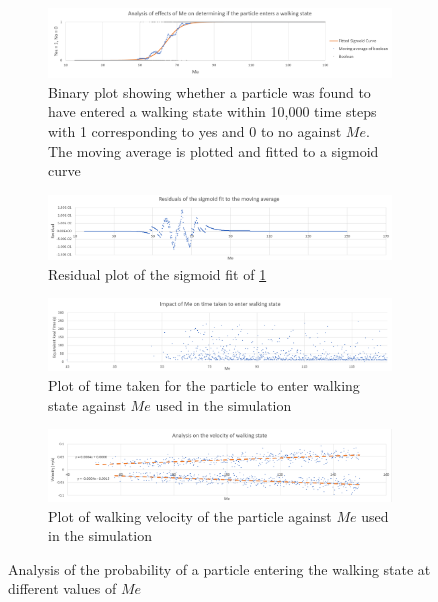 \begin{figure}
	\centering
	\begin{subfigure}{\textwidth}
		\includegraphics[width=\textwidth]{simulation/varmemory/walkingstate.png}
		\caption{Binary plot showing whether a particle was found to have entered a walking state within 10,000 time steps with 1 corresponding to yes and 0 to no against $Me$. The moving average is plotted and fitted to a sigmoid curve}
		\label{fig:varmem:walkingstate}
	\end{subfigure}
	 \begin{subfigure}{\textwidth}
		\includegraphics[width=\textwidth]{simulation/varmemory/residuals.png}
		\caption{Residual plot of the sigmoid fit of \ref{fig:varmem:walkingstate}}
		\label{fig:varmem:residualplot}
	\end{subfigure}
	\begin{subfigure}{\textwidth}
		\includegraphics[width=\textwidth]{simulation/varmemory/meWalkingState.png}
		\caption{Plot of time taken for the particle to enter walking state against $Me$ used in the simulation}
		\label{fig:varmem:timewalking}
	\end{subfigure}
	
	\begin{subfigure}{\textwidth}
		\includegraphics[width=\textwidth]{simulation/varmemory/velocityWalkingState.png}
		\caption{Plot of walking velocity of the particle against $Me$ used in the simulation}
		\label{fig:varmem:walkingvel}
	\end{subfigure}
\caption{Analysis of the probability of a particle entering the walking state at different values of $Me$}
\label{fig:varmem}
\end{figure}

